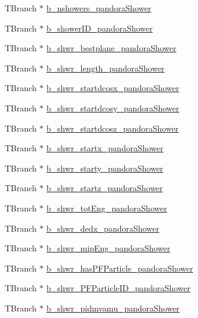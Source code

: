\begin{DoxyCompactItemize}
T\-Branch $\ast$ \hyperlink{classanatree_a8a698e08ce4ed8674ef21a67a3884022}{b\-\_\-nshowers\-\_\-pandora\-Shower}
\item 
T\-Branch $\ast$ \hyperlink{classanatree_a8e83c9853e77a90ceecdabf5697ca8a5}{b\-\_\-shower\-I\-D\-\_\-pandora\-Shower}
\item 
T\-Branch $\ast$ \hyperlink{classanatree_aff5a7af328e941f284512fa23fec7031}{b\-\_\-shwr\-\_\-bestplane\-\_\-pandora\-Shower}
\item 
T\-Branch $\ast$ \hyperlink{classanatree_a71d4808f7c45a03f10640bfa71d8c847}{b\-\_\-shwr\-\_\-length\-\_\-pandora\-Shower}
\item 
T\-Branch $\ast$ \hyperlink{classanatree_a6bafea3f0dc3d8f95f66f73b808f0efa}{b\-\_\-shwr\-\_\-startdcosx\-\_\-pandora\-Shower}
\item 
T\-Branch $\ast$ \hyperlink{classanatree_a8546771985d5f24f917cf1d0918c5c67}{b\-\_\-shwr\-\_\-startdcosy\-\_\-pandora\-Shower}
\item 
T\-Branch $\ast$ \hyperlink{classanatree_a7aebf947ddf346c1b6be7b1983628361}{b\-\_\-shwr\-\_\-startdcosz\-\_\-pandora\-Shower}
\item 
T\-Branch $\ast$ \hyperlink{classanatree_af4666e944c9456a7ae1fbe8827ccc3a5}{b\-\_\-shwr\-\_\-startx\-\_\-pandora\-Shower}
\item 
T\-Branch $\ast$ \hyperlink{classanatree_a106c9fa45debb77f184735cb773766c7}{b\-\_\-shwr\-\_\-starty\-\_\-pandora\-Shower}
\item 
T\-Branch $\ast$ \hyperlink{classanatree_a4e1143f9366974c7c0657fcd3920faff}{b\-\_\-shwr\-\_\-startz\-\_\-pandora\-Shower}
\item 
T\-Branch $\ast$ \hyperlink{classanatree_abc15f7ebf8677f06801acbd5c80661b2}{b\-\_\-shwr\-\_\-tot\-Eng\-\_\-pandora\-Shower}
\item 
T\-Branch $\ast$ \hyperlink{classanatree_a3b8c7af91999bae4f94f576d6fbbb83c}{b\-\_\-shwr\-\_\-dedx\-\_\-pandora\-Shower}
\item 
T\-Branch $\ast$ \hyperlink{classanatree_a0bee5983273d4d9ba19fc0dc3d3fbec4}{b\-\_\-shwr\-\_\-mip\-Eng\-\_\-pandora\-Shower}
\item 
T\-Branch $\ast$ \hyperlink{classanatree_a66fedd157b85ddcf163dbdd960035744}{b\-\_\-shwr\-\_\-has\-P\-F\-Particle\-\_\-pandora\-Shower}
\item 
T\-Branch $\ast$ \hyperlink{classanatree_a6cdb4ded648b9a5653813d5e6f83417d}{b\-\_\-shwr\-\_\-\-P\-F\-Particle\-I\-D\-\_\-pandora\-Shower}
\item 
T\-Branch $\ast$ \hyperlink{classanatree_a479472fc39be8a6602d8c684b8efcf95}{b\-\_\-shwr\-\_\-pidmvamu\-\_\-pandora\-Shower}

\end{DoxyCompactItemize}

